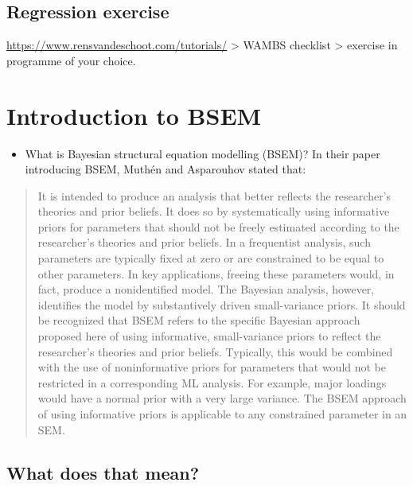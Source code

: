 \documentclass[
]{book}
\providecommand{\tightlist}{%
  \setlength{\itemsep}{0pt}\setlength{\parskip}{0pt}}
\begin{document}
\section{Regression exercise}\label{regression-exercise}

\url{https://www.rensvandeschoot.com/tutorials/} \textgreater{} WAMBS checklist \textgreater{} exercise in programme of your choice.

\chapter{Introduction to BSEM}\label{introduction-to-bsem}

\begin{itemize}
\tightlist
\item
  What is Bayesian structural equation modelling (BSEM)? In their paper introducing BSEM, Muthén and Asparouhov \citeyearpar[p 316]{Muthen2012} stated that:
\end{itemize}

\begin{quote}
It is intended to produce an analysis that better reflects the researcher's theories and prior beliefs. It does so by systematically using informative priors for parameters that should not be freely estimated according to the researcher's theories and prior beliefs. In a frequentist analysis, such parameters are typically fixed at zero or are constrained to be equal to other parameters. In key applications, freeing these parameters would, in fact, produce a nonidentified model. The Bayesian analysis, however, identifies the model by substantively driven small-variance priors. It should be recognized that BSEM refers to the specific Bayesian approach proposed here of using informative, small-variance priors to reflect the researcher's theories and prior beliefs. Typically, this would be combined with the use of noninformative priors for parameters that would not be restricted in a corresponding ML analysis. For example, major loadings would have a normal prior with a very large variance. The BSEM approach of using informative priors is applicable to any constrained parameter in an SEM.
\end{quote}

\section{What does that mean?}\label{what-does-that-mean}
\end{document}
